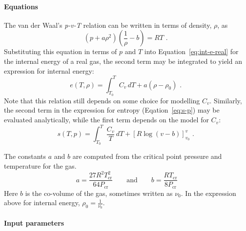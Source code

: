 \paragraph{Equations}
The van der Waal's \textit{p-v-T} relation can be written
in terms of density, $\rho$, as
\begin{equation}
  \left ( p + a\rho^2 \right ) \left ( \frac{1}{\rho} - b \right ) = RT \text{ . }
\end{equation}
Substituting this equation in terms of $p$ and $T$ into Equation~\ref{eq:int-e-real} for the internal energy of a real gas, the second term may be integrated to yield an expression for internal energy:
\begin{equation}
e(T, \rho) = \int_{T_0}^{T} C_v\,dT + a \left( \rho - \rho_0 \right) \text{ . }
\end{equation}
Note that this relation still depends on some choice for modelling $C_v$.
Similarly, the second term in the expression for entropy (Eqation~\ref{eq:s-p})
may be evaluated analytically, while the first term depends on the model for $C_v$:
\begin{equation}
s(T,p) = \int_{T_0}^{T} \frac{C_v}{T}\,dT + \left [ R \log \left( v - b \right ) \right ]_{v_0}^{v} \text { . }
\end{equation}


The constants $a$ and $b$ are computed from the critical point pressure and
temperature for the gas.
\begin{equation}
   a = \frac{27 R^2 T^2_{\text{cr}}}{64 P_{\text{cr}}} \qquad \text{and} \qquad
   b = \frac{R T_{\text{cr}}}{8 P_{\text{cr}}}
\end{equation}
Here $b$ is the co-volume of the gas, sometimes written as $\nu_0$.
In the expression above for internal energy, $\rho_0 = \frac{1}{\nu_0}$.

\paragraph{Input parameters}

